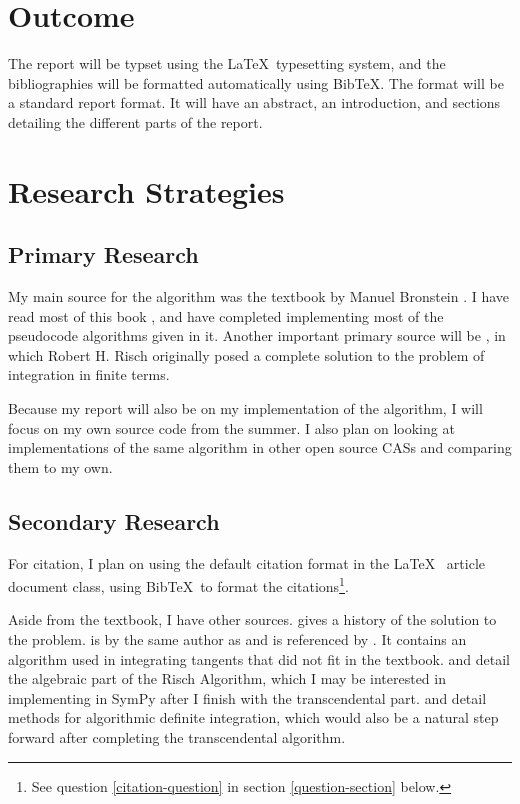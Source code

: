 \documentclass[12pt]{article}
\newcommand{\BibTeX}{{\sc Bib}\TeX}
\newcommand{\bibtex}{{\sc Bib}\TeX\ }
\newcommand{\latex}{\LaTeX\ }
\begin{document}
\section{Outcome}
The report will be typset using the \latex typesetting system, and the
bibliographies will be formatted automatically using \BibTeX.  The
format will be a standard report format.  It will have an abstract, an
introduction, and sections detailing the different parts of the report.
\section{Research Strategies}
\subsection{Primary Research}
My main source for the algorithm was the textbook by Manuel Bronstein
\cite{bronstein2005symbolic}.  I have read most of this book , and have
completed implementing most of the pseudocode algorithms given in it.
Another important primary source will be \cite{risch1969problem}, in
which Robert H. Risch originally posed a complete solution to the
problem of integration in finite terms.  

Because my report will also be on my implementation of the algorithm, I
will focus on my own source code from the summer.  I also plan on
looking at implementations of the same algorithm in other open source
CASs and comparing them to my own.
\subsection{Secondary Research}
\label{secondary-research}
For citation, I plan on using the default citation format in the \latex
article document class, using \bibtex to format the
citations\footnote{See question \ref{citation-question} in section
\ref{question-section} below.}.

Aside from the textbook, I have other sources. \cite{moses1971symbolic}
gives a history of the solution to the problem.
\cite{bronstein1989simplification} is by the same author as and is
referenced by \cite{bronstein1989simplification}.  It contains an
algorithm used in integrating tangents that did not fit in the textbook.
\cite{davenport1984integration} and \cite{kauers2008integration} detail
the algebraic part of the Risch Algorithm, which I may be interested in
implementing in Sym\-Py  after I finish with the transcendental part.
\cite{adamchik1990hypergeometric} and \cite{roach1997meijerg} detail
methods for algorithmic definite integration, which would also be a
natural step forward after completing the transcendental algorithm.
\end{document}
